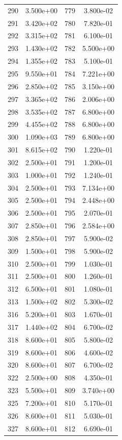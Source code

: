 \documentclass[12pt]{article}
\begin{document}
\begin{longtable}{@{}cccc@{}}
290 & 3.500e+00 & 779 & 3.800e-02 \\
291 & 3.420e+02 & 780 & 7.820e-01 \\
292 & 3.315e+02 & 781 & 6.100e-01 \\
293 & 1.430e+02 & 782 & 5.500e+00 \\
294 & 1.355e+02 & 783 & 5.100e-01 \\
295 & 9.550e+01 & 784 & 7.221e+00 \\
296 & 2.850e+02 & 785 & 3.150e+00 \\
297 & 3.365e+02 & 786 & 2.006e+00 \\
298 & 3.535e+02 & 787 & 6.800e+00 \\
299 & 4.455e+02 & 788 & 6.800e+00 \\
300 & 1.090e+03 & 789 & 6.800e+00 \\
301 & 8.615e+02 & 790 & 1.220e-01 \\
302 & 2.500e+01 & 791 & 1.200e-01 \\
303 & 1.000e+01 & 792 & 1.240e-01 \\
304 & 2.500e+01 & 793 & 7.134e+00 \\
305 & 2.500e+01 & 794 & 2.448e+00 \\
306 & 2.500e+01 & 795 & 2.070e-01 \\
307 & 2.850e+01 & 796 & 2.584e+00 \\
308 & 2.850e+01 & 797 & 5.900e-02 \\
309 & 1.500e+01 & 798 & 5.900e-02 \\
310 & 2.500e+01 & 799 & 1.030e-01 \\
311 & 2.500e+01 & 800 & 1.260e-01 \\
312 & 6.500e+01 & 801 & 1.080e-01 \\
313 & 1.500e+02 & 802 & 5.300e-02 \\
316 & 5.200e+01 & 803 & 1.670e-01 \\
317 & 1.440e+02 & 804 & 6.700e-02 \\
318 & 8.600e+01 & 805 & 5.800e-02 \\
319 & 8.600e+01 & 806 & 4.600e-02 \\
320 & 8.600e+01 & 807 & 6.700e-02 \\
322 & 2.500e+00 & 808 & 4.350e-01 \\
323 & 5.500e+01 & 809 & 3.740e+00 \\
325 & 7.200e+01 & 810 & 5.170e-01 \\
326 & 8.600e+01 & 811 & 5.030e-01 \\
327 & 8.600e+01 & 812 & 6.690e-01 \\

\end{longtable}
\end{document}
